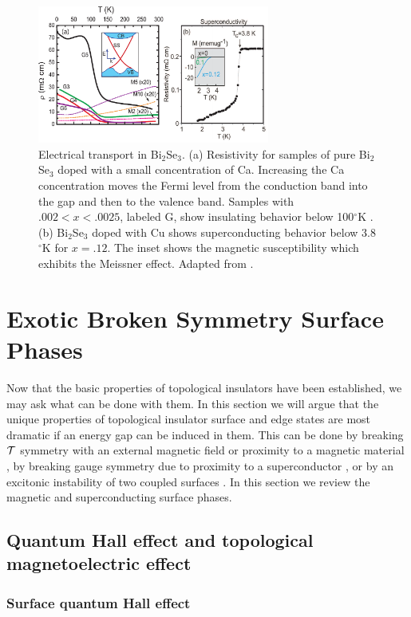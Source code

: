 \documentclass[twocolumn,floatfix,showpacs,rmp,aps]{revtex4}
\begin{document}
\begin{figure}
\includegraphics[width=3in]{Fig17}%
\caption{Electrical transport in Bi$_2$Se$_3$.  (a) Resistivity for samples of
pure Bi$_2$Se$_3$ doped with a small concentration of Ca.  Increasing the Ca
concentration moves the Fermi level from the conduction band into the gap and
then to the valence band.  Samples with $.002<x<.0025$, labeled G,
show insulating behavior below 100$^\circ$K \cite{checkelsky09}.  (b) Bi$_2$Se$_3$ doped with Cu shows superconducting behavior
below 3.8$^\circ$K for $x = .12$.  The inset shows the magnetic susceptibility
which exhibits the Meissner effect.  Adapted from .
}
\label{fig:transport}
\end{figure}

\section{Exotic Broken Symmetry Surface Phases}
\label{sec:exoticsurface}

Now that the basic properties of topological insulators have been established,
we may ask what can be done with them.  In this section we will argue
that the unique properties of topological insulator surface and edge
states are most dramatic if an energy gap can be induced in them.
This can be done by breaking ${\cal T}$ symmetry with an external
magnetic field \cite{fukane07} or proximity to a magnetic material \cite{qihugheszhang08}, by breaking gauge
symmetry due to proximity to a superconductor \cite{fukane08}, or by an excitonic
instability of two coupled surfaces \cite{seradjeh09}.  In this section we review
the magnetic and superconducting surface phases.

\subsection{Quantum Hall effect and topological magnetoelectric effect}
\label{sec:qhetopomag}

\subsubsection{Surface quantum Hall effect}
\label{sec:surfaceqhe}
\end{document}
